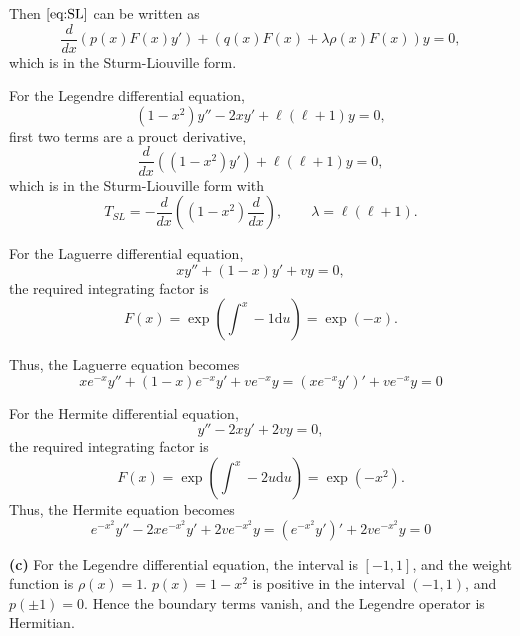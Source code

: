 \documentclass[12pt]{article}
\begin{document}
Then $\eqref{eq:SL}$ can be written as
\begin{equation}
    \frac{d}{dx}\left(p(x)F(x)y'\right) + \left(q(x)F(x)+\lambda \rho(x) F(x)\right)y = 0,
\end{equation}
which is in the Sturm-Liouville form.
\smallbreak

For the Legendre differential equation,
\begin{equation}
    (1-x^2)y'' - 2xy' + \ell(\ell + 1)y = 0,
\end{equation}
first two terms are a prouct derivative, 
\begin{equation}
    \frac{d}{dx}\left((1-x^2)y'\right) + \ell(\ell + 1)y = 0,
\end{equation}
which is in the Sturm-Liouville form with
\begin{equation}
    T_{SL} = -\frac{d}{dx}\left((1-x^2)\frac{d}{dx}\right), \qquad \lambda = \ell(\ell + 1).
\end{equation}

\smallbreak
For the Laguerre differential equation,
\begin{equation}
    xy'' + (1-x)y' + v y = 0,
\end{equation}
the required integrating factor is
\begin{equation}
    F(x) = \exp \left( \int^x -1 \mathrm{d}u \right) = \exp(-x).
\end{equation}

Thus, the Laguerre equation becomes
\begin{equation}
    x e^{-x} y'' + (1-x)e^{-x}y' + v e^{-x}y = (xe^{-x}y')' + ve^{-x}y = 0
\end{equation}

\smallbreak
For the Hermite differential equation,
\begin{equation}    
    y'' - 2xy' + 2vy = 0,
\end{equation}
the required integrating factor is
\begin{equation}
    F(x) = \exp \left( \int^x -2u \mathrm{d}u \right) = \exp(-x^2).
\end{equation}
Thus, the Hermite equation becomes
\begin{equation}
    e^{-x^2}y'' - 2xe^{-x^2}y' + 2ve^{-x^2}y = (e^{-x^2}y')' + 2ve^{-x^2}y = 0
\end{equation}

\pagebreak

\noindent\textbf{(c)} \quad For the Legendre differential equation, the interval is $[-1,1]$, and the weight function is $\rho(x) = 1$. $p(x) = 1-x^2$ is positive in the interval $(-1,1)$, and $p(\pm 1) = 0$. Hence the boundary terms vanish, and the Legendre operator is Hermitian.
\smallbreak
\end{document}
